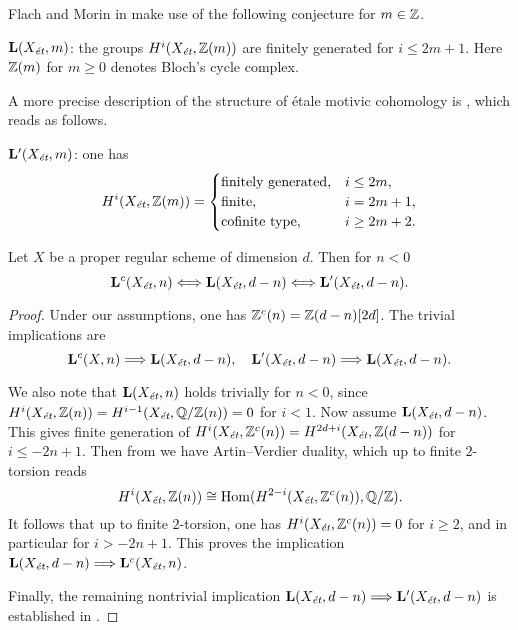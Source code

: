 \documentclass{article}
\numberwithin{equation}{section}
\begin{document}
\vspace{1em}

Flach and Morin in \cite{Flach-Morin-2018} make use of the following conjecture
for $m \in \ZZ$.

\begin{conjecture}
  $\mathbf{L} (X_\et, m)$: the groups $H^i (X_\et, \ZZ (m))$ are finitely
  generated for $i \le 2m+1$. Here $\ZZ (m)$ for $m \ge 0$ denotes Bloch's cycle
  complex.
\end{conjecture}

A more precise description of the structure of étale motivic cohomology is
\cite[Conjecture~4.12]{Geisser-2017}, which reads as follows.

\begin{conjecture}
  $\mathbf{L}' (X_\et, m)$: one has
  \[ H^i (X_\et, \ZZ (m)) = \begin{cases}
      \text{finitely generated}, & i \le 2m, \\
      \text{finite}, & i = 2m + 1, \\
      \text{cofinite type}, & i \ge 2m + 2.
    \end{cases} \]
\end{conjecture}

\begin{proposition}
  \label{prop:Lc-Xet-n-vs-L-Xet-d-n}
  Let $X$ be a proper regular scheme of dimension $d$. Then for $n < 0$
  \[ \mathbf{L}^c (X_\et, n) \Longleftrightarrow
    \mathbf{L} (X_\et, d-n) \Longleftrightarrow
    \mathbf{L}' (X_\et, d-n). \]

  \begin{proof}
    Under our assumptions, one has $\ZZ^c (n) = \ZZ (d-n) [2d]$. The trivial
    implications are
    \[ \mathbf{L}^c (X, n) \Longrightarrow \mathbf{L} (X_\et, d-n), \quad
      \mathbf{L}' (X_\et, d-n) \Longrightarrow \mathbf{L} (X_\et, d-n). \]

    We also note that $\mathbf{L} (X_\et, n)$ holds trivially for $n < 0$, since
    $H^i (X_\et, \ZZ (n)) = H^{i-1} (X_\et, \QQ/\ZZ (n)) = 0$ for $i < 1$.
    Now assume $\mathbf{L} (X_\et, d-n)$. This gives finite generation of
    $H^i (X_\et, \ZZ^c (n)) = H^{2d+i} (X_\et, \ZZ (d-n))$ for $i \le -2n + 1$.
    Then from \cite[Proposition~3.4]{Flach-Morin-2018} we have Artin--Verdier
    duality, which up to finite $2$-torsion reads
    $$H^i (X_\et, \ZZ (n)) \cong \Hom (H^{2-i} (X_\et, \ZZ^c (n)), \QQ/\ZZ).$$
    It follows that up to finite $2$-torsion, one has
    $H^i (X_\et, \ZZ^c (n)) = 0$ for $i \ge 2$, and in particular for
    $i > -2n + 1$. This proves the implication
    $\mathbf{L} (X_\et, d-n) \Longrightarrow \mathbf{L}^c (X_\et, n)$.

    Finally, the remaining nontrivial implication
    $\mathbf{L} (X_\et, d-n) \Longrightarrow \mathbf{L}' (X_\et, d-n)$ is
    established in \cite[Proposition~3.4]{Flach-Morin-2018}.
  \end{proof}
\end{proposition}
\end{document}
